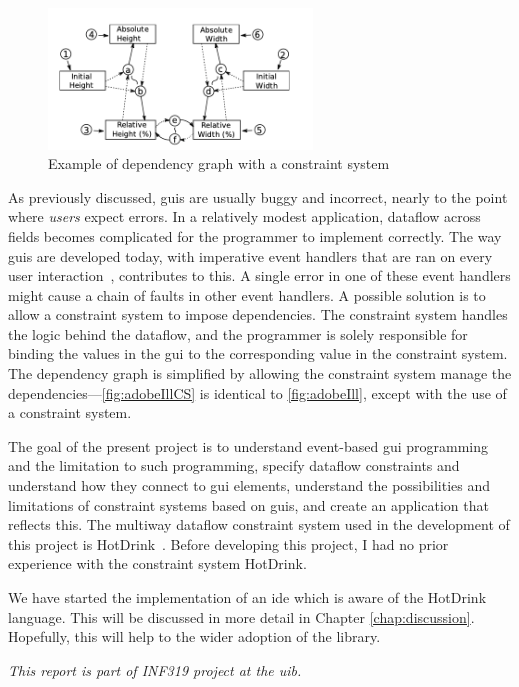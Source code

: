 
\begin{figure}
    \centering
    \includegraphics[width=7cm, frame]{figures/adobeIllCS.png}
    \caption{Example of dependency graph with a constraint system}
    \label{fig:adobeIllCS}
\end{figure}

As previously discussed, \gls{gui}s are usually buggy and incorrect, nearly to the point where \emph{users} expect errors. In a relatively modest application, dataflow across fields becomes complicated for the programmer to implement correctly. The way \gls{gui}s are developed today, with imperative event handlers that are ran on every user interaction~\cite{all2021multi}, contributes to this. A single error in one of these event handlers might cause a chain of faults in other event handlers. A possible solution is to allow a constraint system to impose dependencies. The constraint system handles the logic behind the dataflow, and the programmer is solely responsible for binding the values in the \gls{gui} to the corresponding value in the constraint system. The dependency graph is simplified by allowing the constraint system manage the dependencies---\autoref{fig:adobeIllCS} is identical to \autoref{fig:adobeIll}, except with the use of a constraint system.

The goal of the present project is to understand event-based \gls{gui} programming and the limitation to such programming, specify dataflow constraints and understand how they connect to \gls{gui} elements, understand the possibilities and limitations of constraint systems based on \gls{gui}s, and create an application that reflects this. The multiway dataflow constraint system used in the development of this project is HotDrink~\cite{HotDrink, HotDrink1}. Before developing this project, I had no prior experience with the constraint system HotDrink.

We have started the implementation of an \gls{ide} which is aware of the HotDrink language. This will be discussed in more detail in Chapter \ref{chap:discussion}. Hopefully, this will help to the wider adoption of the library.

\textit{This report is part of INF319 project at the \gls{uib}.}
